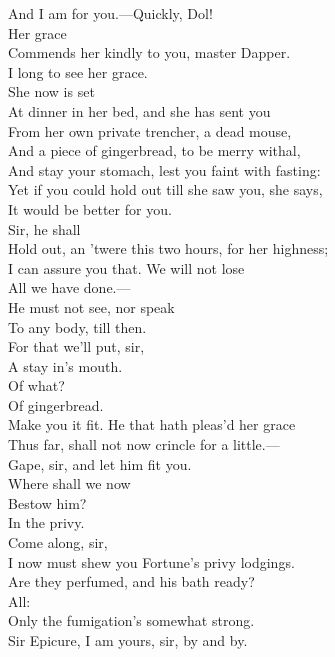 \documentclass[a4paper,oneside]{memoir}
\begin{document}
\begin{drama*}
And I am for you.---Quickly, Dol!\\
\subtlespeaks {} Her grace\\
Commends her kindly to you, master Dapper.\\
\dapperspeaks I long to see her grace.\\
\subtlespeaks {} She now is set\\
At dinner in her bed, and she has sent you\\
From her own private trencher, a dead mouse,\\
And a piece of gingerbread, to be merry withal,\\
And stay your stomach, lest you faint with fasting:\\
Yet if you could hold out till she saw you, she says,\\
It would be better for you.\\
\facespeaks {} Sir, he shall\\
Hold out, an 'twere this two hours, for her highness;\\
I can assure you that. We will not lose\\
All we have done.---\\
\subtlespeaks {} He must not see, nor speak\\
To any body, till then.\\
\facespeaks {} For that we'll put, sir,\\
A stay in's mouth.\\
\subtlespeaks {} Of what?\\
\facespeaks {} Of gingerbread.\\
Make you it fit. He that hath pleas'd her grace\\
Thus far, shall not now crincle for a little.---\\
Gape, sir, and let him fit you.\\
\subtlespeaks {} Where shall we now\\
Bestow him?\\
\dolspeaks {} In the privy.\\
\subtlespeaks {} Come along, sir,\\
I now must shew you Fortune's privy lodgings.\\
\facespeaks Are they perfumed, and his bath ready?\\
\subtlespeaks {} All:\\
Only the fumigation's somewhat strong.\\
\facespeaks {}
Sir Epicure, I am yours, sir, by and by.\\
\act


\end{drama*}
\end{document}
